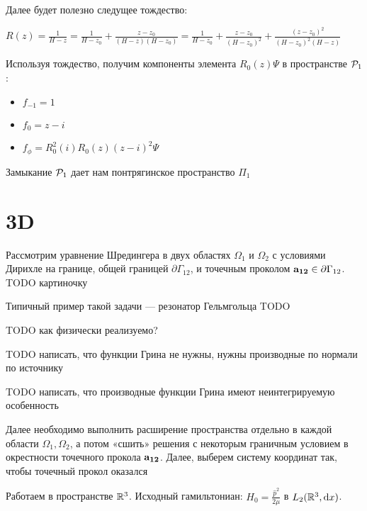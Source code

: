 Далее будет полезно следущее тождество:

$R(z) = \frac{1}{H - z} = \frac{1}{H - z_0} + \frac{z - z_0}{(H - z)(H - z_0)} = \frac{1}{H - z_0} + \frac{z - z_0}{(H - z_0)^2} + \frac{(z - z_0)^2}{(H - z_0)^2 (H - z)}$

Используя тождество, получим компоненты элемента $R_0(z) \Psi$ в пространстве $\mathcal{P}_1$:

\begin{itemize}
\item $f_{-1} = 1$
\item $f_0 = z - i$
\item $f_\phi = R_0^2(i) R_0(z) (z - i)^2 \Psi$
\end{itemize}



Замыкание $\mathcal{P}_1$ дает нам понтрягинское пространство $\Pi_1$


\section{3D}
Рассмотрим уравнение Шредингера в двух областях $\Omega_1$ и $\Omega_2$ с условиями Дирихле на границе, общей границей $\partial \Gamma_{12}$, и точечным проколом $\vb{a_{12}} \in \partial \Gamma_{12}$. TODO картиночку

Типичный пример такой задачи — резонатор Гельмгольца TODO

TODO как физически реализуемо?

TODO написать, что функции Грина не нужны, нужны производные по нормали по источнику

TODO написать, что производные функции Грина имеют неинтегрируемую особенность

Далее необходимо выполнить расширение пространства отдельно в каждой области $\Omega_1, \Omega_2$, а потом «сшить» решения с некоторым граничным условием в окрестности точечного прокола $\vb{a_{12}}$. Далее, выберем систему координат так, чтобы точечный прокол оказался 

Работаем в пространстве $\mathbb{R}^3$. Исходный гамильтониан: $H_0 = \frac{\hat{p}^2}{2 \mu}$ в $L_2(\mathbb{R}^3, \dd x)$.


